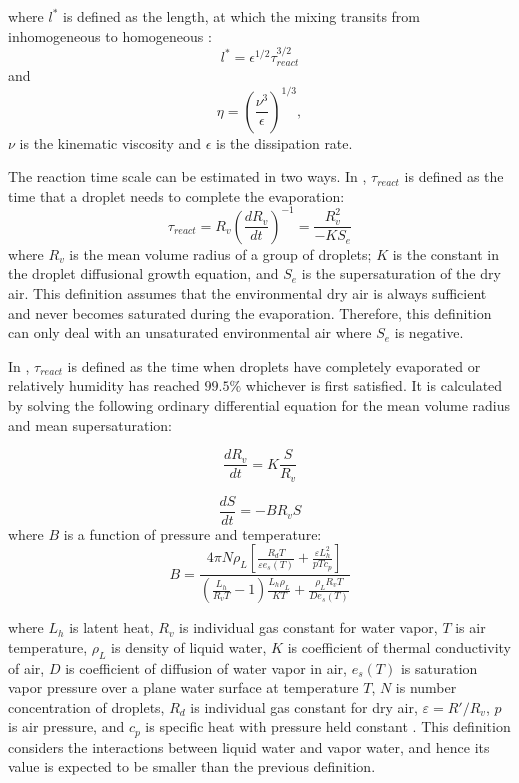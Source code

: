 where $l^{*}$ is defined as the length, at which the mixing transits from inhomogeneous 
to homogeneous \cite{Lehmann2009}:
\[
l^{*}=\epsilon^{1/2}\tau_{react}^{3/2}
\]
and 
\[
\eta = (\frac{\nu^3}{\epsilon})^{1/3}, 
\]
$\nu$ is the kinematic viscosity and $\epsilon$ is the dissipation rate.

The reaction time scale can be estimated in two ways. 
In \cite{And2009, Burnet2007}, $\tau_{react}$ is defined as the time that a droplet needs 
to complete the evaporation:
\begin{equation}
\tau_{react} = R_v(\frac{dR_v}{dt})^{-1} = \frac{R_v^2}{-KS_e}
\end{equation}
where $R_v$ is the mean volume radius of a group of droplets; $K$ is the constant in the 
droplet diffusional growth equation, and $S_e$ is the supersaturation of the dry air. 
This definition assumes that the environmental dry air is always 
sufficient and never becomes saturated during the evaporation. Therefore, this definition 
can only deal with an unsaturated environmental air where $S_e$ is negative.

In \cite{Lehmann2009, Lu2013}, $\tau_{react}$ is defined as the time when droplets have completely 
evaporated or relatively humidity has reached $99.5\%$ whichever is first satisfied. It is calculated 
by solving the following ordinary differential equation for the mean volume radius and mean supersaturation:

\begin{equation}
\frac{dR_{v}}{dt}=K\frac{S}{R_{v}}\label{eq:DiffR}
\end{equation}

\begin{equation}
\frac{dS}{dt}=-BR_{v}S\label{eq:DiffSuper}
\end{equation}
where $B$ is a function of pressure and temperature:
\begin{equation}
B = 
\frac{4\pi N\rho_L[\frac{R_dT}{\varepsilon e_s(T)} + \frac{\varepsilon L^2_h}{pTc_p}]} 
{(\frac{L_h}{R_vT}-1)\frac{L_h\rho_L}{KT} + \frac{\rho_L R_v T}{De_s(T)}}
\end{equation}

where $L_h$ is latent heat, $R_v$ is individual gas constant for water vapor,
$T$ is air temperature, $\rho_L$ is density of liquid water, $K$ is coefficient
of thermal conductivity of air, $D$ is coefficient of diffusion of water vapor
in air, $e_s(T)$ is saturation vapor pressure over a plane water surface at
temperature $T$, $N$ is number concentration of droplets, $R_d$ is individual
gas constant for dry air, $\varepsilon = R'/R_v$, $p$ is air pressure, and
$c_p$ is specific heat with pressure held constant \cite{Lu2011}.
This definition considers the interactions between liquid water and vapor water, 
and hence its value is expected to be smaller than the previous definition. 

